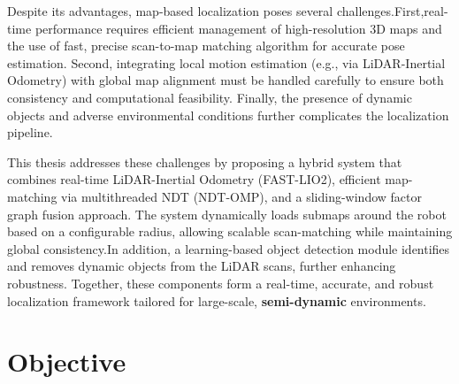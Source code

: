 Despite its advantages, map-based localization poses several challenges.First,real-time performance requires efficient management of high-resolution 3D maps and the use of fast, precise scan-to-map matching algorithm for accurate pose estimation. Second, integrating local motion estimation (e.g., via LiDAR-Inertial Odometry) with global map alignment must be handled carefully to ensure both consistency and computational feasibility. Finally, the presence of dynamic objects and adverse environmental conditions further complicates the localization pipeline.


This thesis addresses these challenges by proposing a hybrid system that combines real-time LiDAR-Inertial Odometry (FAST-LIO2), efficient map-matching via multithreaded NDT (NDT-OMP), and a sliding-window factor graph fusion approach. The system dynamically loads submaps around the robot based on a configurable radius, allowing scalable scan-matching while maintaining global consistency.In addition, a learning-based object detection module identifies and removes dynamic objects from the LiDAR scans, further enhancing robustness. Together, these components form a real-time, accurate, and robust localization framework tailored for large-scale, \textbf{semi-dynamic} environments.

\section{Objective}

